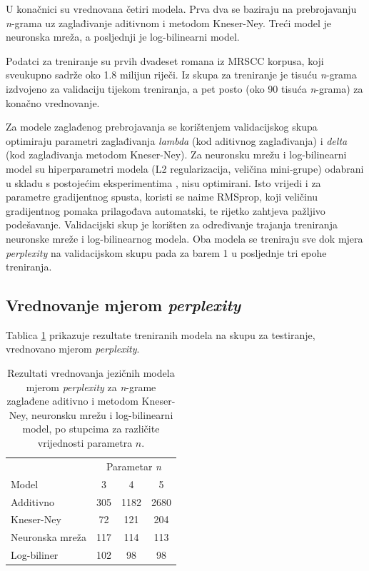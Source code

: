 \documentclass[times, utf8, diplomski, numeric]{fer}
\begin{document}
U konačnici su vrednovana četiri modela. Prva dva se baziraju na prebrojavanju \textit{n}-grama uz zaglađivanje aditivnom i metodom Kneser-Ney. Treći model je neuronska mreža, a posljednji je log-bilinearni model.

Podatci za treniranje su prvih dvadeset romana iz MRSCC korpusa, koji sveukupno sadrže oko 1.8 milijun riječi. Iz skupa za treniranje je tisuću \textit{n}-grama izdvojeno za validaciju tijekom treniranja, a pet posto (oko 90 tisuća \textit{n}-grama) za konačno vrednovanje.

Za modele zaglađenog prebrojavanja se korištenjem validacijskog skupa optimiraju parametri zaglađivanja \textit{lambda} (kod aditivnog zaglađivanja) i \textit{delta} (kod zaglađivanja metodom Kneser-Ney). Za neuronsku mrežu i log-bilinearni model su hiperparametri modela (L2 regularizacija, veličina mini-grupe) odabrani u skladu s postojećim eksperimentima \cite{MnihH07}, nisu optimirani. Isto vrijedi i za parametre gradijentnog spusta, koristi se naime RMSprop, koji veličinu gradijentnog pomaka prilagođava automatski, te rijetko zahtjeva pažljivo podešavanje. Validacijski skup je korišten za određivanje trajanja treniranja neuronske mreže i log-bilinearnog modela. Oba modela se treniraju sve dok mjera \textit{perplexity} na validacijskom skupu pada za barem 1 u posljednje tri epohe treniranja.

\subsection{Vrednovanje mjerom \textit{perplexity}}

Tablica \ref{tbl:eval_perplexity} prikazuje rezultate treniranih modela na skupu za testiranje, vrednovano mjerom \textit{perplexity}.

\begin{table}[htb]
\caption{Rezultati vrednovanja jezičnih modela mjerom \textit{perplexity} za \textit{n}-grame zaglađene aditivno i metodom Kneser-Ney, neuronsku mrežu i log-bilinearni model, po stupcima za različite vrijednosti parametra $n$.}
\label{tbl:eval_perplexity}
\centering
\begin{tabular}{lccc}
\toprule
 & \multicolumn{3}{c}{Parametar \textit{n}} \\
\cmidrule(r){2-4}
Model & 3 & 4 & 5 \\
\midrule
Additivno &  305 & 1182 & 2680 \\
Kneser-Ney & 72 & 121 & 204 \\
Neuronska mreža & 117 & 114 & 113 \\
Log-biliner & 102 & 98 & 98 \\
\bottomrule
\end{tabular}
\end{table}
\end{document}
